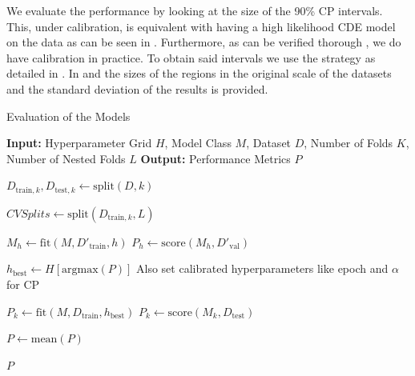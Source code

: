 We evaluate the performance by looking at the size of the 90\% CP intervals. This, under calibration, is equivalent with having a high likelihood CDE model on the data as can be seen in . Furthermore, as can be verified thorough , we do have calibration in practice. To obtain said intervals we use the strategy as detailed in . In  and  the sizes of the regions in the original scale of the datasets and the standard deviation of the results is provided.

\begin{algorithm}
    \caption{Evaluation of the Models}\label{alg:evaluation}
    \begin{algorithmic}
        \STATE\textbf{Input:} Hyperparameter Grid $H$, Model Class $M$, Dataset $D$, Number of Folds $K$, Number of Nested Folds $L$
        \STATE\textbf{Output:} Performance Metrics $P$

        \STATE$D_{\text{train}, k}, D_{\text{test}, k} \leftarrow \text{split}(D, k)$

        \STATE$CVSplits \leftarrow \text{split}(D_{\text{train}, k}, L)$

        \STATE$M_h \leftarrow \text{fit}(M, D'_{\text{train}}, h)$
        \STATE$P_h \leftarrow \text{score}(M_h, D'_{\text{val}})$
        \ENDFOR%
        \ENDFOR%

        \STATE$h_{\text{best}} \leftarrow H[\text{argmax}(P)]$ Also set calibrated hyperparameters like epoch and $\alpha$ for CP

        \STATE$P_k \leftarrow \text{fit}(M, D_{\text{train}}, h_{\text{best}})$
        \STATE$P_k \leftarrow \text{score}(M_k, D_{\text{test}})$
        \ENDFOR%

        \STATE$P \leftarrow \text{mean}(P)$

        \RETURN$P$
    \end{algorithmic}
\end{algorithm}

